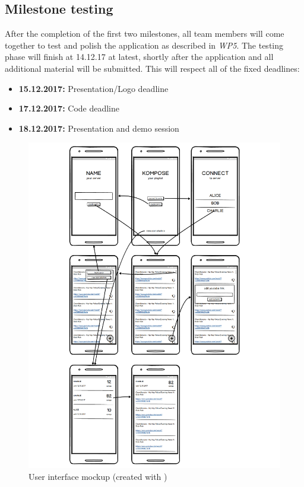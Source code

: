 \documentclass{report}
\begin{document}
\subsection{Milestone testing}
After the completion of the first two milestones, all team members will come together to test and polish the application
as described in \emph{WP5}. The testing phase will finish at 14.12.17 at latest, shortly after the application and 
all additional material will be submitted. This will respect all of the fixed deadlines:

\begin{itemize}
    \item {\bf 15.12.2017:} Presentation/Logo deadline
    \item {\bf 17.12.2017:} Code deadline
    \item {\bf 18.12.2017:} Presentation and demo session
\end{itemize}



\begin{figure}
    \includegraphics[width=\textwidth]{../design/mockups.pdf}
    \caption{User interface mockup (created with \cite{balsamiq})}
\end{figure}
\end{document}
